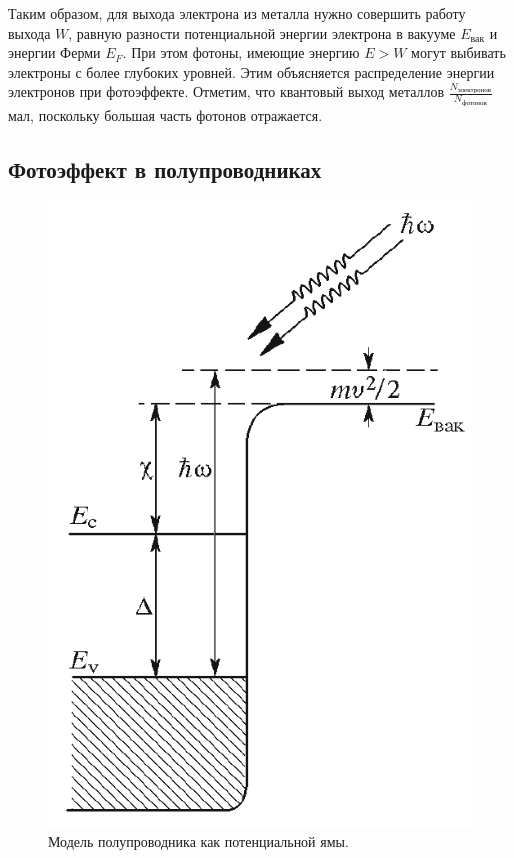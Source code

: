 \documentclass[a4paper, 12pt]{article} %
\begin{document}
	Таким образом, для выхода электрона из металла нужно совершить работу выхода $W$, равную разности потенциальной энергии электрона в вакууме $E_{\text{вак}}$ и энергии Ферми $E_F$. При этом фотоны, имеющие энергию $E > W$ могут выбивать электроны с более глубоких уровней. Этим объясняется распределение энергии электронов при фотоэффекте. Отметим, что квантовый выход металлов $\frac{N_{\text{электронов}}}{N_{\text{фотонов}}}$ мал, поскольку большая часть фотонов отражается.

	\subsection{Фотоэффект в полупроводниках}
	
					  
	\begin{figure}
		\includegraphics[scale=0.6]{res/semiconductor.png}
		\caption{Модель полупроводника как потенциальной ямы.}
		\label{fig:semiconductor}
		\vspace{0pt}
	\end{figure}
	
\end{document}
